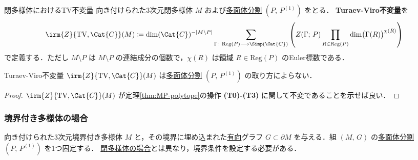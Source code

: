 \documentclass[TQFT_main]{subfiles}
\begin{document}
\begin{mydef}[label=def:TV-closed]{閉多様体におけるTV不変量}
    向き付けられた3次元閉多様体 $M$ および\hyperref[def:polytope-decomp]{多面体分割} $(P,\, P^{(1)})$ をとる．
    \textbf{Turaev-Viro不変量}を
    \begin{align}
        \irm{Z}{\text{TV},\Cat{C}}(M) \coloneqq \dim(\Cat{C})^{-\abs{M \setminus P}} \sum_{\Gamma \colon \mathrm{Reg}(P) \lto \Simp(\Cat{C})} \left(Z(\Gamma;\, P) \prod_{R \in \mathrm{Reg}(P)} \dim \bigl( \Gamma(R) \bigr)^{\chi(R)}\right)
    \end{align}
    で定義する．ただし $M\setminus P$ は $M \setminus P$ の連結成分の個数で，$\chi (R)$ は\hyperref[def:polyhedron]{領域} $R \in \mathrm{Reg}(P)$ のEuler標数である．
\end{mydef}

\begin{mytheo}[label=thm:TV-closed]{}
    Turaev-Viro不変量 $\irm{Z}{\text{TV},\Cat{C}}(M)$ は\hyperref[def:polytope-decomp]{多面体分割} $(P,\, P^{(1)})$ の取り方によらない．
\end{mytheo}

\begin{proof}
    $\irm{Z}{\text{TV},\Cat{C}}(M)$ が定理\ref{thm:MP-polytope}の操作 \textsf{\textbf{(T0)-(T3)}} に関して不変であることを示せば良い．
\end{proof}

\subsubsection{境界付き多様体の場合}

向き付けられた3次元境界付き多様体 $M$ と，その境界に埋め込まれた\underline{有向}グラフ $G \subset \partial M$ を与える．組 $(M,\, G)$ の\hyperref[def:polytope-decomp]{多面体分割} $(P,\, P^{(1)})$ を1つ固定する．
\hyperref[def:TV-closed]{閉多様体の場合}とは異なり，境界条件を設定する必要がある．
\end{document}
